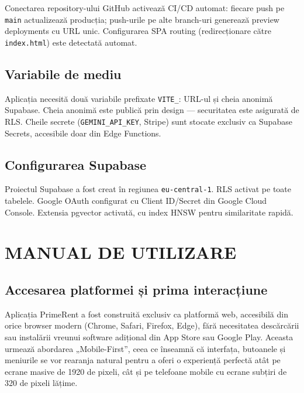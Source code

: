 \documentclass[12pt,a4paper,oneside]{report}
\begin{document}
Conectarea repository-ului GitHub activează CI/CD automat: fiecare push pe \texttt{main} actualizează producția; push-urile pe alte branch-uri generează preview deployments cu URL unic. Configurarea SPA routing (redirecționare către \texttt{index.html}) este detectată automat.

\section{Variabile de mediu}

Aplicația necesită două variabile prefixate \texttt{VITE\_}: URL-ul și cheia anonimă Supabase. Cheia anonimă este publică prin design — securitatea este asigurată de RLS. Cheile secrete (\texttt{GEMINI\_API\_KEY}, Stripe) sunt stocate exclusiv ca Supabase Secrets, accesibile doar din Edge Functions.

\section{Configurarea Supabase}

Proiectul Supabase a fost creat în regiunea \texttt{eu-central-1}. RLS activat pe toate tabelele. Google OAuth configurat cu Client ID/Secret din Google Cloud Console. Extensia pgvector activată, cu index HNSW pentru similaritate rapidă.


\chapter{MANUAL DE UTILIZARE}

\section{Accesarea platformei și prima interacțiune}

Aplicația PrimeRent a fost construită exclusiv ca platformă web, accesibilă din orice browser modern (Chrome, Safari, Firefox, Edge), fără necesitatea descărcării sau instalării vreunui software adițional din App Store sau Google Play. Aceasta urmează abordarea „Mobile-First'', ceea ce înseamnă că interfața, butoanele și meniurile se vor rearanja natural pentru a oferi o experiență perfectă atât pe ecrane masive de 1920 de pixeli, cât și pe telefoane mobile cu ecrane subțiri de 320 de pixeli lățime.
\end{document}
